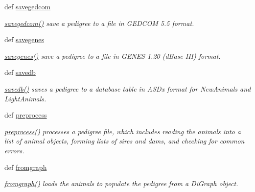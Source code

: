 \begin{DoxyCompactItemize}
def \hyperlink{classPyPedal_1_1pyp__newclasses_1_1NewPedigree_a4f3ef3055fd807086da58aac2c6499f7}{savegedcom}
\begin{DoxyCompactList}\small\item\em \hyperlink{classPyPedal_1_1pyp__newclasses_1_1NewPedigree_a4f3ef3055fd807086da58aac2c6499f7}{savegedcom()} save a pedigree to a file in GEDCOM 5.5 format. \end{DoxyCompactList}\item 
def \hyperlink{classPyPedal_1_1pyp__newclasses_1_1NewPedigree_a41abde8769a72486d5d0e352072338d4}{savegenes}
\begin{DoxyCompactList}\small\item\em \hyperlink{classPyPedal_1_1pyp__newclasses_1_1NewPedigree_a41abde8769a72486d5d0e352072338d4}{savegenes()} save a pedigree to a file in GENES 1.20 (dBase III) format. \end{DoxyCompactList}\item 
def \hyperlink{classPyPedal_1_1pyp__newclasses_1_1NewPedigree_abe7890df1b04734981aa7e1e1e4054ec}{savedb}
\begin{DoxyCompactList}\small\item\em \hyperlink{classPyPedal_1_1pyp__newclasses_1_1NewPedigree_abe7890df1b04734981aa7e1e1e4054ec}{savedb()} saves a pedigree to a database table in ASDx format for NewAnimals and LightAnimals. \end{DoxyCompactList}\item 
def \hyperlink{classPyPedal_1_1pyp__newclasses_1_1NewPedigree_aa70701de178f69d9c7a3321448681a03}{preprocess}
\begin{DoxyCompactList}\small\item\em \hyperlink{classPyPedal_1_1pyp__newclasses_1_1NewPedigree_aa70701de178f69d9c7a3321448681a03}{preprocess()} processes a pedigree file, which includes reading the animals into a list of animal objects, forming lists of sires and dams, and checking for common errors. \end{DoxyCompactList}\item 
def \hyperlink{classPyPedal_1_1pyp__newclasses_1_1NewPedigree_a9d014c1ead82bb6abe3085058086194a}{fromgraph}
\begin{DoxyCompactList}\small\item\em \hyperlink{classPyPedal_1_1pyp__newclasses_1_1NewPedigree_a9d014c1ead82bb6abe3085058086194a}{fromgraph()} loads the animals to populate the pedigree from a DiGraph object. \end{DoxyCompactList}\item 

\end{DoxyCompactItemize}
